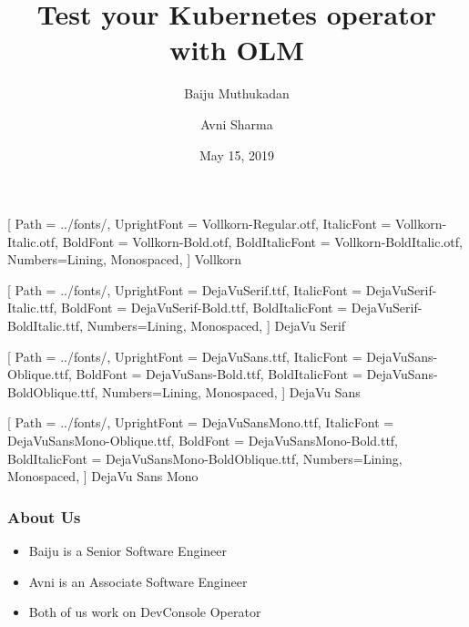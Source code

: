 \documentclass[aspectratio=169]{beamer}
\title{Test your Kubernetes operator with OLM}
\author{Baiju Muthukadan \and Avni Sharma}
\date{May 15, 2019}
\begin{document}
\beamertemplatenavigationsymbolsempty

\setmainfont
[ Path = ../fonts/,
UprightFont = DejaVuSerif.ttf,
ItalicFont = DejaVuSerif-Italic.ttf,
BoldFont = DejaVuSerif-Bold.ttf,
BoldItalicFont = DejaVuSerif-BoldItalic.ttf,
Numbers={Lining, Monospaced},
] {DejaVu Serif}

\setsansfont
[ Path = ../fonts/,
UprightFont = DejaVuSans.ttf,
ItalicFont = DejaVuSans-Oblique.ttf,
BoldFont = DejaVuSans-Bold.ttf,
BoldItalicFont = DejaVuSans-BoldOblique.ttf,
Numbers={Lining, Monospaced},
] {DejaVu Sans}

\setmonofont
[ Path = ../fonts/,
UprightFont = DejaVuSansMono.ttf,
ItalicFont = DejaVuSansMono-Oblique.ttf,
BoldFont = DejaVuSansMono-Bold.ttf,
BoldItalicFont = DejaVuSansMono-BoldOblique.ttf,
Numbers={Lining, Monospaced},
] {DejaVu Sans Mono}


\newfontfamily{\vollkorn}
[ Path = ../fonts/,
UprightFont = Vollkorn-Regular.otf,
ItalicFont = Vollkorn-Italic.otf,
BoldFont = Vollkorn-Bold.otf,
BoldItalicFont = Vollkorn-BoldItalic.otf,
Numbers={Lining, Monospaced},
] {Vollkorn}

\newfontfamily{\dejavuserif}
[ Path = ../fonts/,
UprightFont = DejaVuSerif.ttf,
ItalicFont = DejaVuSerif-Italic.ttf,
BoldFont = DejaVuSerif-Bold.ttf,
BoldItalicFont = DejaVuSerif-BoldItalic.ttf,
Numbers={Lining, Monospaced},
] {DejaVu Serif}

\newfontfamily{\dejavusans}
[ Path = ../fonts/,
UprightFont = DejaVuSans.ttf,
ItalicFont = DejaVuSans-Oblique.ttf,
BoldFont = DejaVuSans-Bold.ttf,
BoldItalicFont = DejaVuSans-BoldOblique.ttf,
Numbers={Lining, Monospaced},
] {DejaVu Sans}

\newfontfamily{\dejavumono}
[ Path = ../fonts/,
UprightFont = DejaVuSansMono.ttf,
ItalicFont = DejaVuSansMono-Oblique.ttf,
BoldFont = DejaVuSansMono-Bold.ttf,
BoldItalicFont = DejaVuSansMono-BoldOblique.ttf,
Numbers={Lining, Monospaced},
] {DejaVu Sans Mono}

\frame{\titlepage}

\begin{frame}
  \frametitle{About Us}

  \begin{itemize}
  \item Baiju is a Senior Software Engineer
  \item Avni is an Associate Software Engineer
  \item Both of us work on DevConsole Operator
  \end{itemize}

\end{frame}
\end{document}
